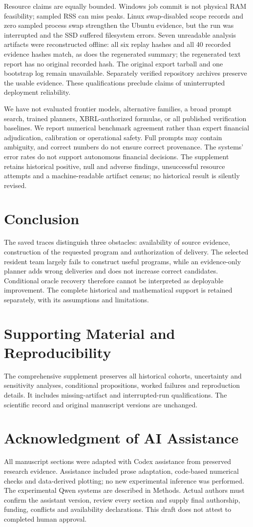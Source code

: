 \documentclass[runningheads]{llncs}
\begin{document}
Resource claims are equally bounded. Windows job commit is not physical RAM feasibility; sampled RSS can miss peaks. Linux swap-disabled scope records and zero sampled process swap strengthen the Ubuntu evidence, but the run was interrupted and the SSD suffered filesystem errors. Seven unreadable analysis artifacts were reconstructed offline: all six replay hashes and all 40 recorded evidence hashes match, as does the regenerated summary; the regenerated text report has no original recorded hash. The original export tarball and one bootstrap log remain unavailable. Separately verified repository archives preserve the usable evidence. These qualifications preclude claims of uninterrupted deployment reliability.

We have not evaluated frontier models, alternative families, a broad prompt search, trained planners, XBRL-authorized formulas, or all published verification baselines. We report numerical benchmark agreement rather than expert financial adjudication, calibration or operational safety. Full prompts may contain ambiguity, and correct numbers do not ensure correct provenance. The systems' error rates do not support autonomous financial decisions. The supplement retains historical positive, null and adverse findings, unsuccessful resource attempts and a machine-readable artifact census; no historical result is silently revised.

\section{Conclusion}The saved traces distinguish three obstacles: availability of source evidence, construction of the requested program and authorization of delivery. The selected resident team largely fails to construct useful programs, while an evidence-only planner adds wrong deliveries and does not increase correct candidates. Conditional oracle recovery therefore cannot be interpreted as deployable improvement. The complete historical and mathematical support is retained separately, with its assumptions and limitations.
\section*{Supporting Material and Reproducibility}
The comprehensive supplement preserves all historical cohorts, uncertainty and sensitivity analyses, conditional propositions, worked failures and reproduction details. It includes missing-artifact and interrupted-run qualifications. The scientific record and original manuscript versions are unchanged.
\section*{Acknowledgment of AI Assistance}
All manuscript sections were adapted with Codex assistance from preserved research evidence. Assistance included prose adaptation, code-based numerical checks and data-derived plotting; no new experimental inference was performed. The experimental Qwen systems are described in Methods. Actual authors must confirm the assistant version, review every section and supply final authorship, funding, conflicts and availability declarations. This draft does not attest to completed human approval.


\end{document}
